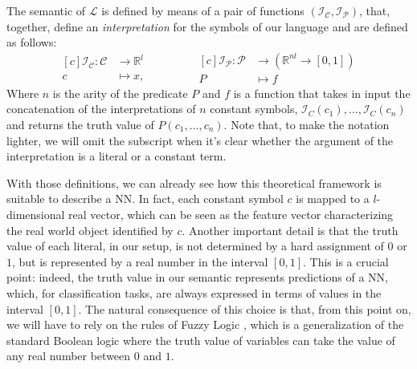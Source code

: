 \begin{definition}
	The semantic of $\mathcal{L}$ is defined by means of a pair of functions $\left( \mathcal{I}_{\mathcal{C}}, \mathcal{I}_{\mathcal{P}} \right)$, that, together, define an \textit{interpretation} for the symbols of our language and are defined as follows:
	\begin{equation}
	\begin{aligned}[c]
			\mathcal{I}_{\mathcal{C}}: \mathcal{C} &\longrightarrow \mathbb{R}^l\\
			c&\longmapsto x,
	\end{aligned}
	\qquad \qquad
	\begin{aligned}[c]
	\mathcal{I}_{\mathcal{P}}: \mathcal{P} &\longrightarrow \left( \mathbb{R}^{nl} \rightarrow \left[0,1\right] \right)\\
	P &\longmapsto f
	\end{aligned}
	\end{equation}	
	Where $n$ is the arity of the predicate $P$ and $f$ is a function that takes in input the concatenation of the interpretations of $n$ constant symbols, $\mathcal{I}_C(c_1), \dots, \mathcal{I}_C(c_n)$ and returns the truth value of $P(c_1,\dots,c_n)$. Note that, to make the notation lighter, we will omit the subscript when it's clear whether the argument of the interpretation is a literal or a constant term.
\end{definition}

With those definitions, we can already see how this theoretical framework is suitable to describe a NN. In fact, each constant symbol $c$ is mapped to a $l$-dimensional real vector, which can be seen as the feature vector characterizing the real world object identified by $c$. Another important detail is that the truth value of each literal, in our setup, is not determined by a hard assignment of $0$ or $1$, but is represented by a real number in the interval $\left[ 0,1 \right]$. 
This is a crucial point: indeed, the truth value in our semantic represents predictions of a NN, which, for classification tasks, are always expressed in terms of values in the interval $\left[0,1\right]$. The natural consequence of this choice is that, from this point on, we will have to rely on the rules of Fuzzy Logic \cite{novak1987first}, which is a generalization of the standard Boolean logic where the truth value of variables can take the value of any real number between $0$ and $1$. 

